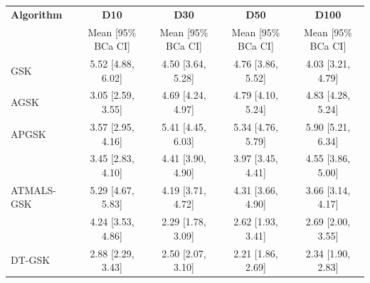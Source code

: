 \begin{tabular}{lcccc}
\toprule
\textbf{Algorithm} & \textbf{D10} & \textbf{D30} & \textbf{D50} & \textbf{D100} \\
            & Mean [95\% BCa CI] & Mean [95\% BCa CI] & Mean [95\% BCa CI] & Mean [95\% BCa CI] \\
\midrule
GSK & 5.52 [4.88, 6.02] & 4.50 [3.64, 5.28] & 4.76 [3.86, 5.52] & 4.03 [3.21, 4.79] \\
AGSK & 3.05 [2.59, 3.55] & 4.69 [4.24, 4.97] & 4.79 [4.10, 5.24] & 4.83 [4.28, 5.24] \\
APGSK & 3.57 [2.95, 4.16] & 5.41 [4.45, 6.03] & 5.34 [4.76, 5.79] & 5.90 [5.21, 6.34] \\
\fdbagsk{} & 3.45 [2.83, 4.10] & 4.41 [3.90, 4.90] & 3.97 [3.45, 4.41] & 4.55 [3.86, 5.00] \\
ATMALS-GSK & 5.29 [4.67, 5.83] & 4.19 [3.71, 4.72] & 4.31 [3.66, 4.90] & 3.66 [3.14, 4.17] \\
\egsk{} & 4.24 [3.53, 4.86] & 2.29 [1.78, 3.09] & 2.62 [1.93, 3.41] & 2.69 [2.00, 3.55] \\
DT-GSK & 2.88 [2.29, 3.43] & 2.50 [2.07, 3.10] & 2.21 [1.86, 2.69] & 2.34 [1.90, 2.83] \\
\bottomrule
\end{tabular}

